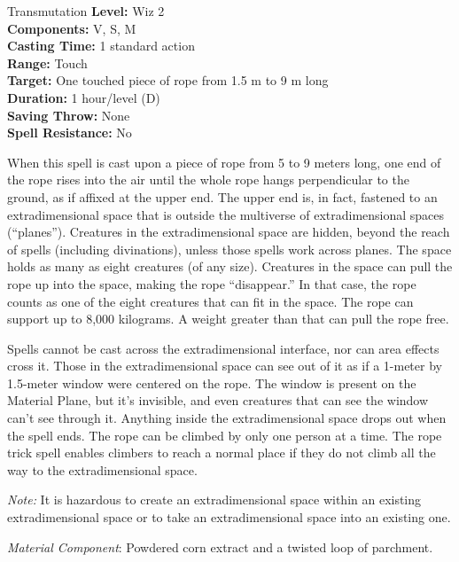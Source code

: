 {Transmutation}
{
	\textbf{Level:}
	Wiz 2\\
	\textbf{Components:}
	V, S, M\\
	\textbf{Casting Time:}
	1 standard action\\
	\textbf{Range:}
	Touch\\
	\textbf{Target:}
	One touched piece of rope from 1.5 m to 9 m long\\
	\textbf{Duration:}
	1 hour/level (D)\\
	\textbf{Saving Throw:}
	None\\
	\textbf{Spell Resistance:}
	No\\
}
{
	When this spell is cast upon a piece of rope from 5 to 9 meters long, one end of the rope rises into the air until the whole rope hangs perpendicular to the ground, as if affixed at the upper end. The upper end is, in fact, fastened to an extradimensional space that is outside the multiverse of extradimensional spaces (``planes''). Creatures in the extradimensional space are hidden, beyond the reach of spells (including divinations), unless those spells work across planes. The space holds as many as eight creatures (of any size). Creatures in the space can pull the rope up into the space, making the rope ``disappear.'' In that case, the rope counts as one of the eight creatures that can fit in the space. The rope can support up to 8,000 kilograms. A weight greater than that can pull the rope free.

	Spells cannot be cast across the extradimensional interface, nor can area effects cross it. Those in the extradimensional space can see out of it as if a 1-meter by 1.5-meter window were centered on the rope. The window is present on the Material Plane, but it's invisible, and even creatures that can see the window can't see through it. Anything inside the extradimensional space drops out when the spell ends. The rope can be climbed by only one person at a time. The rope trick spell enables climbers to reach a normal place if they do not climb all the way to the extradimensional space.

	\textit{Note:} It is hazardous to create an extradimensional space within an existing extradimensional space or to take an extradimensional space into an existing one.

	\textit{Material Component}:
	Powdered corn extract and a twisted loop of parchment.

}
